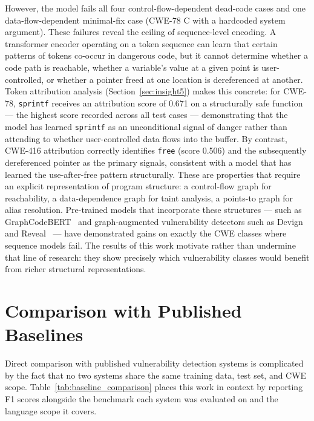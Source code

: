 However, the model fails all four control-flow-dependent dead-code cases and one
data-flow-dependent minimal-fix case (CWE-78 C with a hardcoded system argument).
These failures reveal the ceiling of sequence-level encoding.
A transformer encoder operating on a token sequence can learn that certain patterns of
tokens co-occur in dangerous code, but it cannot determine whether a code path is
reachable, whether a variable's value at a given point is user-controlled, or whether
a pointer freed at one location is dereferenced at another.
Token attribution analysis (Section~\ref{sec:insight5}) makes this concrete:
for CWE-78, \texttt{sprintf} receives an attribution score of 0.671 on a structurally
safe function --- the highest score recorded across all test cases --- demonstrating that
the model has learned \texttt{sprintf} as an unconditional signal of danger rather than
attending to whether user-controlled data flows into the buffer.
By contrast, CWE-416 attribution correctly identifies \texttt{free} (score 0.506) and the
subsequently dereferenced pointer as the primary signals, consistent with a model that
has learned the use-after-free pattern structurally.
These are properties that require an explicit representation of program structure:
a control-flow graph for reachability, a data-dependence graph for taint analysis,
a points-to graph for alias resolution.
Pre-trained models that incorporate these structures --- such as
GraphCodeBERT~\cite{guo2021graphcodebert} and graph-augmented vulnerability detectors
such as Devign~\cite{zhou2019devign} and Reveal~\cite{chakraborty2022reveal} --- have
demonstrated gains on exactly the CWE classes where sequence models fail.
The results of this work motivate rather than undermine that line of research:
they show precisely which vulnerability classes would benefit from richer structural
representations.

\section{Comparison with Published Baselines}

Direct comparison with published vulnerability detection systems is complicated by the
fact that no two systems share the same training data, test set, and CWE scope.
Table~\ref{tab:baseline_comparison} places this work in context by reporting F1 scores
alongside the benchmark each system was evaluated on and the language scope it covers.

